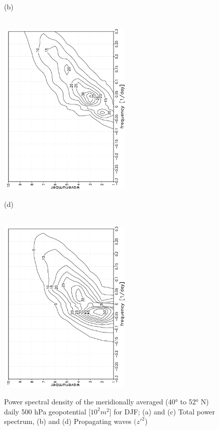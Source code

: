 \documentclass[12pt,a4paper,twoside,openright,headinclude,liststotoc,bibtotoc]{scrreprt}
\begin{document}
\begin{figure}[b]
{}
\parbox{8.5cm}{\hspace{0.50cm}\begin{scriptsize}(b)\end{scriptsize} \vspace{-0.3cm} \\
\includegraphics[height=8.5cm,width=6.5cm,angle=-90]
{eps/wave.srv_travellingDJF.eps}
}
\parbox{8.5cm}{\hspace{0.52cm}\begin{scriptsize}(d)\end{scriptsize} \vspace{-0.3cm} \\
\includegraphics[height=8.5cm,width=6.5cm,angle=-90]
{eps/DJFERA_Z500_travelling.eps}
}
\caption[Wavenumber-frequency spectra]{Power spectral density of the meridionally averaged (40° to 52° N) daily 500 hPa geopotential [$10^2 m^2$] for DJF; (a) and (c) Total power spectrum, (b) and (d) Propagating waves $(z'^{2}$)}
\label{img:frepow}
\end{figure}
\end{document}
